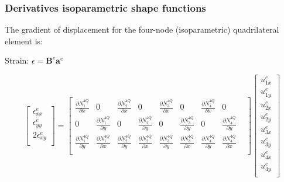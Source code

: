 \documentclass[notes]{beamer}
\begin{document}
\begin{frame}
\frametitle{Derivatives isoparametric shape functions}
The gradient of displacement for the four-node (isoparametric) quadrilateral element is:

	Strain:	$\epsilon = \mathbf{B}^{e}\mathbf{a}^e$
	
	\begin{equation*}
	\begin{bmatrix}
		\epsilon_{xx}^e \\
		\epsilon_{yy}^e \\
		2\epsilon_{xy}^e \\
	\end{bmatrix}	 = %
	\begin{bmatrix}
		\frac{\partial N_1^{4Q}}{\partial x} & 0 &
		\frac{\partial N_2^{4Q}}{\partial x} & 0 &
		\frac{\partial N_3^{4Q}}{\partial x} & 0 &
		\frac{\partial N_4^{4Q}}{\partial x} & 0 \\
		0 &	\frac{\partial N_1^{4Q}}{\partial y} & 
		0 &	\frac{\partial N_2^{4Q}}{\partial y} &
		0 &\frac{\partial N_3^{4Q}}{\partial y} &
		0 & \frac{\partial N_4^{4Q}}{\partial y} \\	
		\frac{\partial N_1^{4Q}}{\partial y} & \frac{\partial N_1^{4Q}}{\partial x} &  
		\frac{\partial N_2^{4Q}}{\partial y} &
		\frac{\partial N_2^{4Q}}{\partial x} &
		\frac{\partial N_3^{4Q}}{\partial y} &
		\frac{\partial N_3^{4Q}}{\partial x} & 
		\frac{\partial N_4^{4Q}}{\partial y} &
		\frac{\partial N_4^{4Q}}{\partial x} & \\
	\end{bmatrix}
	\begin{bmatrix}
		u_{1x}^e \\
		u_{1y}^e \\
		u_{2x}^e \\
		u_{2y}^e \\
		u_{3x}^e \\
		u_{3y}^e \\
		u_{4x}^e \\
		u_{4y}^e \\
	\end{bmatrix}
	\end{equation*}
\end{frame}
\end{document}

